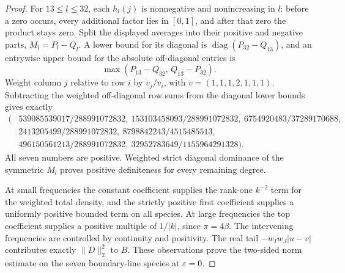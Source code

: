 \begin{proof}
For \(13\le l\le32\), each \(h_l(j)\) is nonnegative and
nonincreasing in \(l\): before a zero occurs, every additional
factor lies in \([0,1]\), and after that zero the product stays
zero.  Split the displayed averages into their positive and
negative parts, \(M_l=P_l-Q_l\).  A lower bound for its diagonal
is \(\operatorname{diag}(P_{32}-Q_{13})\), and an entrywise upper
bound for the absolute off-diagonal entries is
\[
 \max(P_{13}-Q_{32},\,Q_{13}-P_{32}).
\]
Weight column \(j\) relative to row \(i\) by \(v_j/v_i\), with
\(v=(1,1,1,2,1,1,1)\).
Subtracting the weighted off-diagonal row sums from the diagonal
lower bounds gives exactly
\[
\begin{split}
 (&539085539017/288991072832,\ 
 153103458093/288991072832,\ 
 6754920483/37289170688,\\
 &2413205499/288991072832,\ 
 8798842243/4515485513,\\
 &496150561213/288991072832,\ 
 32952783649/1155964291328).
\end{split}
\]
All seven numbers are positive.  Weighted strict diagonal
dominance of the symmetric \(M_l\) proves positive definiteness
for every remaining degree.

At small frequencies the constant coefficient supplies the
rank-one \(k^{-2}\) term for the weighted total density, and the
strictly positive first coefficient supplies a uniformly positive
bounded term on all species.  At large frequencies the top
coefficient supplies a positive multiple of \(1/|k|\), since
\(\pi=4\beta\).  The intervening frequencies are controlled by
continuity and positivity.  The real tail
\(-w_Iw_J|u-v|\) contributes exactly \(\|D\|_2^2\) to \(B\).
These observations prove the two-sided norm estimate on the
seven boundary-line species at \(\varepsilon=0\).


\end{proof}
